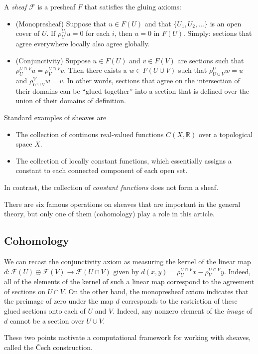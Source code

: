 \documentclass{amsart}
\theoremstyle{plain}
\theoremstyle{definition}
\begin{document}
A {\it sheaf} $\mathcal{F}$ is a presheaf $F$ that satisfies the gluing axioms:
\begin{itemize}
\item (Monopresheaf) Suppose that $u \in F(U)$ and that $\{U_1,
  U_2,...\}$ is an open cover of $U$.  If $\rho_U^{U_i} u = 0$ for
  each $i$, then $u=0$ in $F(U)$.  Simply: sections that agree
  everywhere locally also agree globally.
\item (Conjunctivity) Suppose $u \in F(U)$ and $v \in F(V)$ are
  sections such that $\rho_U^{U\cap V} u = \rho_V^{U \cap V} v$.  Then
  there exists a $w \in F(U \cup V)$ such that $\rho_{U \cup V}^U w =
  u$ and $\rho_{U \cup V}^V w = v$.  In other words, sections that
  agree on the intersection of their domains can be ``glued together''
  into a section that is defined over the union of their domains of
  definition.
\end{itemize}

Standard examples of sheaves are 
\begin{itemize}
\item The collection of continous real-valued functions
  $C(X,\mathbb{R})$ over a topological space $X$.
\item The collection of locally constant functions, which essentially
  assigns a constant to each connected component of each open set.  
\end{itemize}
In contrast, the collection of {\it constant functions} does not form
a sheaf.  

There are six famous operations on sheaves that are important in the
general theory, but only one of them (cohomology)
play a role in this article.

\subsection{Cohomology}
We can recast the conjunctivity axiom as measuring the kernel of the
linear map $d:\mathcal{F}(U) \oplus \mathcal{F}(V) \to \mathcal{F}(U
\cap V)$ given by $d(x,y)=\rho_U^{U\cap V}x-\rho_V^{U\cap V}y$.
Indeed, all of the elements of the kernel of such a linear map
correspond to the agreement of sections on $U \cap V$.
On the other hand, the monopresheaf axiom indicates that the preimage
of zero under the map $d$ corresponds to the restriction of these
glued sections onto each of $U$ and $V$.  Indeed, any nonzero element
of the {\it image} of $d$ cannot be a section over $U \cup V$.  

These two points motivate a computational framework for working with
sheaves, called the \v{C}ech construction.  
\end{document}
